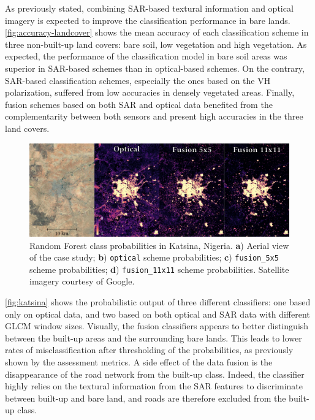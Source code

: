 \documentclass[remotesensing,article,submit,moreauthors,pdftex,10pt,a4paper]{Definitions/mdpi}
\begin{document}
As previously stated, combining SAR-based textural information and optical
imagery is expected to improve the classification performance in bare lands.
\autoref{fig:accuracy-landcover} shows the mean accuracy of each classification
scheme in three non-built-up land covers: bare soil, low vegetation and high
vegetation. As expected, the performance of the classification model in bare
soil areas was superior in SAR-based schemes than in optical-based schemes. On
the contrary, SAR-based classification schemes, especially the ones based on the
VH polarization, suffered from low accuracies in densely vegetated areas.
Finally, fusion schemes based on both SAR and optical data benefited from the
complementarity between both sensors and present high accuracies in the three
land covers.

\begin{figure}[H]
    \centering
    \includegraphics[width=\textwidth]{figures/katsina.png}
    \caption{Random Forest class probabilities in Katsina, Nigeria.
    \textbf{a}) Aerial view of the case study; \textbf{b}) \texttt{optical}
    scheme probabilities; \textbf{c}) \texttt{fusion\_5x5} scheme
    probabilities; \textbf{d}) \texttt{fusion\_11x11} scheme probabilities.
    Satellite imagery courtesy of Google.}
    \label{fig:katsina}
\end{figure}

\autoref{fig:katsina} shows the probabilistic output of three different
classifiers: one based only on optical data, and two based on both optical and
SAR data with different GLCM window sizes. Visually, the fusion classifiers
appears to better distinguish between the built-up areas and the surrounding
bare lands. This leads to lower rates of misclassification after thresholding of
the probabilities, as previously shown by the assessment metrics. A side effect
of the data fusion is the disappearance of the road network from the built-up
class. Indeed, the classifier highly relies on the textural information from the
SAR features to discriminate between built-up and bare land, and roads are
therefore excluded from the built-up class.
\end{document}

